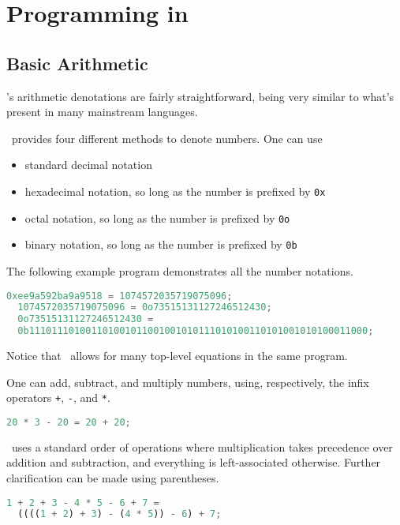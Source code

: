 \section{Programming in \vampir}

\subsection{Basic Arithmetic} \label{ARITH}

\vampir's arithmetic denotations are fairly straightforward, being very similar to what's present in many mainstream languages.

\vampir\ provides four different methods to denote numbers. One can use

\begin{itemize}
  \item standard decimal notation
  \item hexadecimal notation, so long as the number is prefixed by \lstinline{0x}
  \item octal notation, so long as the number is prefixed by \lstinline{0o}
  \item binary notation, so long as the number is prefixed by \lstinline{0b}
\end{itemize}

The following example program demonstrates all the number notations.

\begin{lstlisting}[language=Python]
  0xee9a592ba9a9518 = 1074572035719075096;
  1074572035719075096 = 0o73515131127246512430;
  0o73515131127246512430 =
  0b111011101001101001011001001010111010100110101001010100011000;
\end{lstlisting}

Notice that \vampir\ allows for many top-level equations in the same program.

One can add, subtract, and multiply numbers, using, respectively, the infix operators \lstinline{+}, \lstinline{-}, and \lstinline{*}.

\begin{lstlisting}[language=Python]
  20 * 3 - 20 = 20 + 20;
\end{lstlisting}

\vampir\ uses a standard order of operations where multiplication takes precedence over addition and subtraction, and everything is left-associated otherwise. Further clarification can be made using parentheses.

\begin{lstlisting}[language=Python]
  1 + 2 + 3 - 4 * 5 - 6 + 7 =
  ((((1 + 2) + 3) - (4 * 5)) - 6) + 7;
\end{lstlisting}

